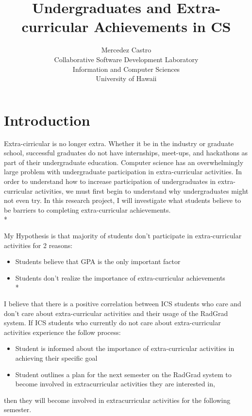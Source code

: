 \documentclass[english]{proposalnsf}
\title{Undergraduates and Extra-curricular Achievements in CS}
\author{Mercedez Castro \\Collaborative Software Development Laboratory \\ Information and Computer Sciences \\ University of Hawaii}
\begin{document}
  \maketitle
  \tableofcontents
  \newpage

  \section{Introduction}
  \label{introduction}

  Extra-cirricular is no longer extra.
  Whether it be in the industry or graduate school, successful graduates do not have internships, meet-ups, and hackathons as part of their undergraduate education.
  Computer science has an overwhelmingly large problem with undergraduate participation in extra-curricular activities.
  In order to understand how to increase participation of undergraduates in extra-curricular activities, we must first begin to understand why undergraduates might not even try.
  In this research project, I will investigate what students believe to be barriers to completing extra-curricular achievements.\\*

  My Hypothesis is that majority of students don't participate in extra-curricular activities for 2 reasons:
  \begin{itemize}
    \item Students believe that GPA is the only important factor
    \item Students don't realize the importance of extra-curricular achievements\\*
  \end{itemize}

  I believe that there is a positive correlation between ICS students who care and don't care about extra-curricular activities and their usage of the RadGrad system.
  If ICS students who currently do not care about extra-curricular activities experience the follow process:
  \begin{itemize}
    \item Student is informed about the importance of extra-curricular activities in achieving their specific goal
    \item Student outlines a plan for the next semester on the RadGrad system to become involved in extracurricular activities they are interested in,
  \end{itemize}
  then they will become involved in extracurricular activities for the following semester.
\end{document}
